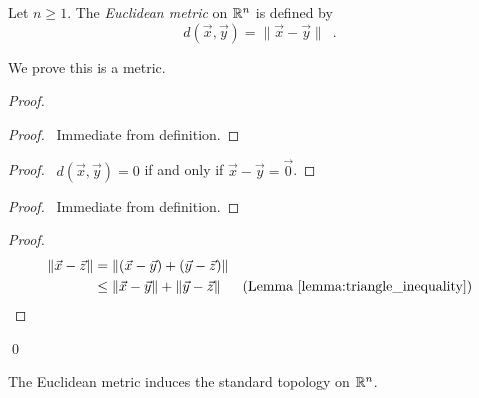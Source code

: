 \begin{definition}
    Let $n \geq 1$. The \emph{Euclidean metric} on $\mathbb{R}^n$ is defined by
    \[ d(\vec{x}, \vec{y}) = \| \vec{x} - \vec{y} \| \enspace . \]
\end{definition}

We prove this is a metric.

\begin{proof}
    \begin{proof}
        \pf\ Immediate from definition.
    \end{proof}
    \begin{proof}
        \pf\ $d(\vec{x}, \vec{y}) = 0$ if and only if $\vec{x} - \vec{y} = \vec{0}$.
    \end{proof}
    \begin{proof}
        \pf\ Immediate from definition.
    \end{proof}
    \begin{proof}
        \pf
        \begin{align*}
            \| \vec{x} - \vec{z} \| & = \| (\vec{x} - \vec{y}) + (\vec{y} - \vec{z}) \| \\
            & \leq \| \vec{x} - \vec{y} \| + \| \vec{y} - \vec{z} \| & (\text{Lemma \ref{lemma:triangle_inequality}})
        \end{align*}
    \end{proof}
    \qed
\end{proof}

\begin{proposition}
    The Euclidean metric induces the standard topology on $\mathbb{R}^n$.
\end{proposition}

